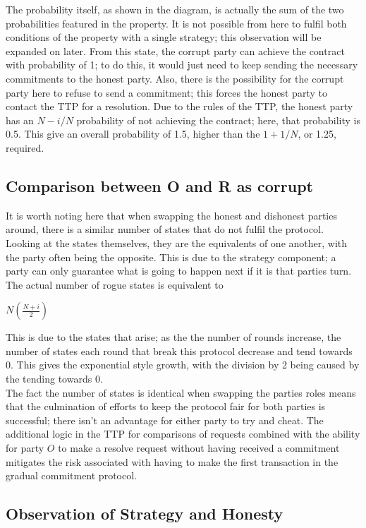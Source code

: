 \documentclass{l4proj}
\begin{document}
The probability itself, as shown in the diagram, is actually the sum of the two probabilities featured in the property. It is not possible from here to fulfil both conditions of the property with a single strategy; this observation will be expanded on later. From this state, the corrupt party can achieve the contract with probability of 1; to do this, it would just need to keep sending the necessary commitments to the honest party. Also, there is the possibility for the corrupt party here to refuse to send a commitment; this forces the honest party to contact the TTP for a resolution. Due to the rules of the TTP, the honest party has an $N-i/N$ probability of not achieving the contract; here, that probability is 0.5. This give an overall probability of 1.5, higher than the $1+1/N$, or 1.25, required.

\subsection{Comparison between O and R as corrupt}
It is worth noting here that when swapping the honest and dishonest parties around, there is a similar number of states that do not fulfil the protocol. Looking at the states themselves, they are the equivalents of one another, with the party often being the opposite. This is due to the strategy component; a party can only guarantee what is going to happen next if it is that parties turn. The actual number of rogue states is equivalent to\\

\centerline{$N\left ( \frac{N + i}{2} \right )$}

This is due to the states that arise; as the the number of rounds increase, the number of states each round that break this protocol decrease and tend towards 0. This gives the exponential style growth, with the division by 2 being caused by the tending towards 0.\\
The fact the number of states is identical when swapping the parties roles means that the culmination of efforts to keep the protocol fair for both parties is successful; there isn't an advantage for either party to try and cheat. The additional logic in the TTP for comparisons of requests combined with the ability for party $O$ to make a resolve request without having received a commitment mitigates the risk associated with having to make the first transaction in the gradual commitment protocol.

\subsection{Observation of Strategy and Honesty}
\end{document}
